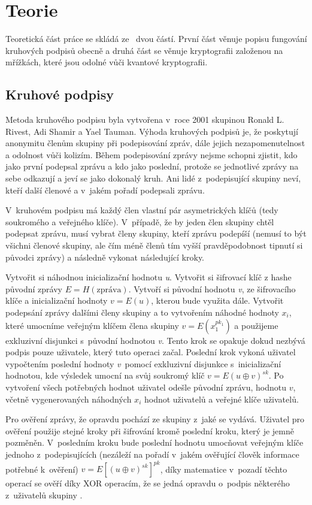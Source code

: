 \chapter{Teorie}
Teoretická část práce se skládá ze~ dvou částí. První část věnuje popisu fungování kruhových podpisů obecně a druhá část se věnuje kryptografii založenou na mřížkách, které jsou odolné vůči kvantové kryptografii.

\section{Kruhové podpisy}

Metoda kruhového podpisu byla vytvořena v~roce 2001 skupinou Ronald L. Rivest, Adi Shamir a Yael Tauman. Výhoda kruhových podpisů je, že poskytují anonymitu členům skupiny při podepisování zpráv, dále jejich nezapomenutelnost a odolnost vůči kolizím. Během podepisování zprávy nejsme schopni zjistit, kdo jako první podepsal zprávu a kdo jako poslední, protože se jednotlivé zprávy na sebe odkazují a jeví se jako dokonalý kruh. Ani lidé z~podepisující skupiny neví, kteří další členové a v~jakém pořadí podepsali zprávu.

V~kruhovém podpisu má každý člen vlastní pár asymetrických klíčů (tedy soukromého a veřejného klíče). V~případě, že by jeden člen skupiny chtěl podepsat zprávu, musí vybrat členy skupiny, kteří zprávu podepíší (nemusí to být všichni členové skupiny, ale čím méně členů tím vyšší pravděpodobnost tipnutí si původci zprávy) a následně vykonat následující kroky. 

Vytvořit si náhodnou inicializační hodnotu \emph{u}. Vytvořit si šifrovací klíč z hashe původní zprávy $E = H(\mathrm{zpráva})$. Vytvoří si původní hodnotu \emph{v}, ze šifrovacího klíče a inicializační hodnoty $v = E(u)$, kterou bude využita dále. Vytvořit podepsání zprávy dalšími členy skupiny a to vytvořením náhodné hodnoty $x_i$, které umocníme veřejným klíčem člena skupiny $v = E(x_1^{pk_1})$ a použijeme exkluzivní disjunkci s~původní hodnotou \emph{v}. Tento krok se opakuje dokud nezbývá podpis pouze uživatele, který tuto operaci začal. Poslední krok vykoná uživatel vypočtením poslední hodnoty \emph{v}~pomocí exkluzivní disjunkce s~inicializační hodnotou, kde výsledek umocní na svůj soukromý klíč $v = E(u \oplus v)^{sk}$. Po vytvoření všech potřebných hodnot uživatel odešle původní zprávu, hodnotu $v$, včetně vygenerovaných náhodných $x_i$ hodnot uživatelů a veřejné klíče uživatelů.

Pro ověření zprávy, že opravdu pochází ze skupiny z~jaké se vydává. Uživatel pro ověření použije stejné kroky při šifrování kromě poslední kroku, který je jemně pozměněn. V~posledním kroku bude poslední hodnotu umocňovat veřejným klíče jednoho z~podepisujících (nezáleží na pořadí v~jakém ověřující člověk informace potřebné k~ověření) $v = E[(u \oplus v)^{sk}]^{pk}$, díky matematice v~pozadí těchto operací se ověří díky XOR operacím, že se jedná opravdu o~podpis některého z~uživatelů skupiny \cite{Buchanan}.

